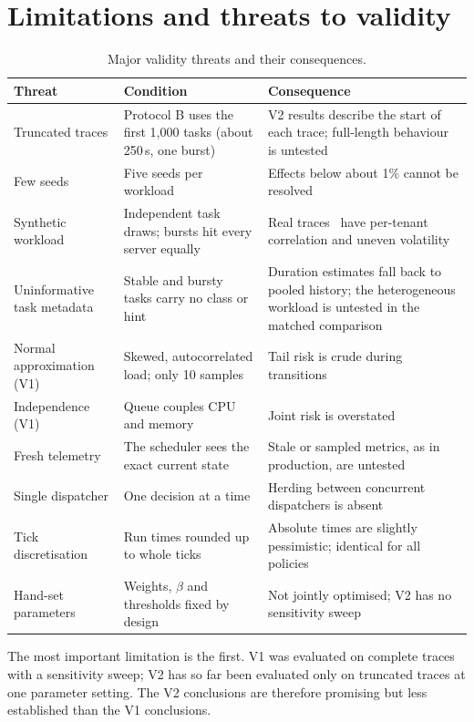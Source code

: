 \documentclass[11pt,a4paper]{article}
\begin{document}
\section{Limitations and threats to validity}

\begin{table}[H]
\caption{Major validity threats and their consequences.}\label{tab:threats}
\begin{tabularx}{\linewidth}{lYY}
\toprule
\textbf{Threat} & \textbf{Condition} & \textbf{Consequence}\\
\midrule
Truncated traces & Protocol B uses the first 1,000 tasks (about 250\,s, one burst) & V2 results describe the start of each trace; full-length behaviour is untested\\
Few seeds & Five seeds per workload & Effects below about 1\% cannot be resolved\\
Synthetic workload & Independent task draws; bursts hit every server equally & Real traces~\cite{reiss2012,tirmazi2020} have per-tenant correlation and uneven volatility\\
Uninformative task metadata & Stable and bursty tasks carry no class or hint & Duration estimates fall back to pooled history; the heterogeneous workload is untested in the matched comparison\\
Normal approximation (V1) & Skewed, autocorrelated load; only 10 samples & Tail risk is crude during transitions\\
Independence (V1) & Queue couples CPU and memory & Joint risk is overstated\\
Fresh telemetry & The scheduler sees the exact current state & Stale or sampled metrics, as in production, are untested\\
Single dispatcher & One decision at a time & Herding between concurrent dispatchers is absent\\
Tick discretisation & Run times rounded up to whole ticks & Absolute times are slightly pessimistic; identical for all policies\\
Hand-set parameters & Weights, $\beta$ and thresholds fixed by design & Not jointly optimised; V2 has no sensitivity sweep\\
\bottomrule
\end{tabularx}
\end{table}

The most important limitation is the first. V1 was evaluated on complete traces with a sensitivity sweep; V2 has
so far been evaluated only on truncated traces at one parameter setting. The V2 conclusions are therefore
promising but less established than the V1 conclusions.
\end{document}
